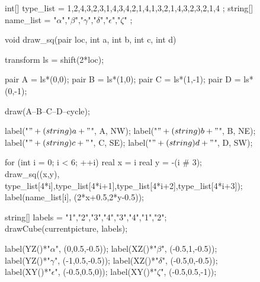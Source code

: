 \documentclass[../key.tex]{subfiles}
\begin{document}
\begin{figure}[h]
	\begin{center}
		\begin{minipage}[b]{0.6\textwidth}
			\centering
			\begin{asy}[width=0.8\textwidth]
			int[] type_list = {
			1,2,4,3,2,3,1,4,3,4,2,1,4,1,3,2,1,4,3,2,3,2,1,4
			};
			string[] name_list = { "$\alpha$","$\beta$","$\gamma$","$\delta$","$\epsilon$","$\zeta$" };
			
			void draw_sq(pair loc, int a, int b, int c, int d) {
			
			transform ls = shift(2*loc);
			
			pair A = ls*(0,0);
			pair B = ls*(1,0);
			pair C = ls*(1,-1);
			pair D = ls*(0,-1);
			
			draw(A--B--C--D--cycle);
			
			label("$" + (string) a + "$", A, NW);
			label("$" + (string) b + "$", B, NE);
			label("$" + (string) c + "$", C, SE);
			label("$" + (string) d + "$", D, SW);
			
			}
			
			for (int i = 0; i < 6; ++i) {
				real x = i%
				real y = -(i # 3);
				draw_sq((x,y), type_list[4*i],type_list[4*i+1],type_list[4*i+2],type_list[4*i+3]);
				label(name_list[i], (2*x+0.5,2*y-0.5));
			}
			\end{asy}
		\end{minipage}
		\hfill
		\begin{minipage}[b]{0.3\textwidth}
			\begin{asy}[width=0.9\textwidth]
			string[] labels = {"1","2","3","4","3","4","1","2"};
			drawCube(currentpicture, labels);
			
			label(YZ()*"$\alpha$", (0,0.5,-0.5));
			label(XZ()*"$\beta$", (-0.5,1,-0.5));
			label(YZ()*"$\gamma$", (-1,0.5,-0.5));
			label(XZ()*"$\delta$", (-0.5,0,-0.5));
			label(XY()*"$\epsilon$", (-0.5,0.5,0));
			label(XY()*"$\zeta$", (-0.5,0.5,-1));
			\end{asy}
		\end{minipage}
	\end{center}
	\vspace*{-2\baselineskip}
	\begin{center}
		\begin{minipage}[t]{0.6\textwidth}
			\label{fig:six_labelings}
		\end{minipage}
		\hfill
		\begin{minipage}[t]{0.3\textwidth}
			\label{fig:labelings_appear}
		\end{minipage}
	\end{center}
	\vspace*{-2\baselineskip}
\end{figure}
\end{document}
